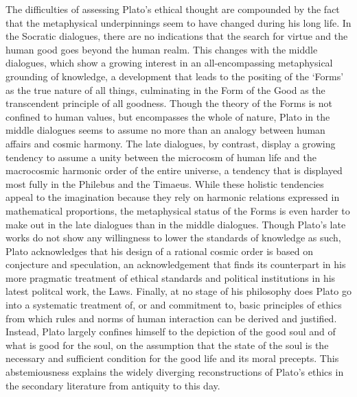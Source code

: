 \documentclass[11pt]{article}
\begin{document}
The difficulties of assessing Plato’s ethical thought are compounded by the fact that the metaphysical underpinnings seem to have changed during his long life. In the Socratic dialogues, there are no indications that the search for virtue and the human good goes beyond the human realm. This changes with the middle dialogues, which show a growing interest in an all-encompassing metaphysical grounding of knowledge, a development that leads to the positing of the ‘Forms’ as the true nature of all things, culminating in the Form of the Good as the transcendent principle of all goodness. Though the theory of the Forms is not confined to human values, but encompasses the whole of nature, Plato in the middle dialogues seems to assume no more than an analogy between human affairs and cosmic harmony. The late dialogues, by contrast, display a growing tendency to assume a unity between the microcosm of human life and the macrocosmic harmonic order of the entire universe, a tendency that is displayed most fully in the Philebus and the Timaeus. While these holistic tendencies appeal to the imagination because they rely on harmonic relations expressed in mathematical proportions, the metaphysical status of the Forms is even harder to make out in the late dialogues than in the middle dialogues. Though Plato’s late works do not show any willingness to lower the standards of knowledge as such, Plato acknowledges that his design of a rational cosmic order is based on conjecture and speculation, an acknowledgement that finds its counterpart in his more pragmatic treatment of ethical standards and political institutions in his latest politcal work, the Laws. Finally, at no stage of his philosophy does Plato go into a systematic treatment of, or and commitment to, basic principles of ethics from which rules and norms of human interaction can be derived and justified. Instead, Plato largely confines himself to the depiction of the good soul and of what is good for the soul, on the assumption that the state of the soul is the necessary and sufficient condition for the good life and its moral precepts. This abstemiousness explains the widely diverging reconstructions of Plato’s ethics in the secondary literature from antiquity to this day.


\end{document}
